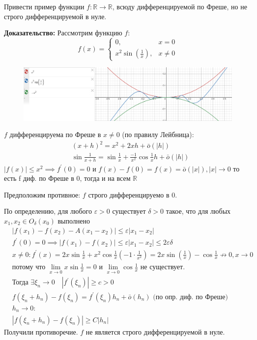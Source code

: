 \begin{task}
Привести пример функции $f: \mathbb{R} \rightarrow \mathbb{R}$, всюду дифференцируемой по Фреше, но не строго дифференцируемой в нуле.

\textbf{Доказательство:}
Рассмотрим функцию $f$:
\[
f(x)= \begin{cases}0, & x=0 \\ x^2 \sin \left(\frac{1}{x}\right), & x \neq 0\end{cases} 
\]

\begin{figure}[h!]
\centering
\includegraphics[width=0.99\linewidth]{image.png}
\end{figure}
 
$f$ дифференцируема по Фреше в $x \neq 0$ (по правилу Лейбница):
\[\begin{aligned}
&(x+h)^2 = x^2 +2xh+ \bar{o}(|h|)\\
& \sin{\frac{1}{x+h}} = \sin{\frac{1}{x}} + \frac{-1}{x^2} \cos{\frac{1}{x}}h + \bar{o}(|h|)
\end{aligned}\]
$|f(x)| \leq x^2 \implies f^{\prime}(0)=0$ и $f(x)-f(0)=f(x) =\bar{o}(|x|), |x| \rightarrow 0 $
то есть f диф. по Фреше в 0, тогда и на всем $\mathbb{R}$

Предположим противное: $f$ строго дифференцируемо в $0$.

По определению,  для любого $\varepsilon>0$ существует $\delta>0$ такое, что для любых $x_1, x_2 \in O_\delta\left(x_0\right)$ выполнено
\[\begin{aligned}
&|f\left(x_1\right)-f\left(x_2\right)-A\left(x_1-x_2\right)|\leq \varepsilon|x_1-x_2| \\
&f^{\prime}(0)=0 \implies |f\left(x_1\right)-f\left(x_2\right)|\leq \varepsilon|x_1-x_2|\leq 2\varepsilon \delta \\
& x\neq 0:  f^{\prime}(x)=2 x \sin \frac{1}{x}+x^2 \cos \frac{1}{x}\left(-1 \cdot \frac{1}{x^2}\right)=2 x \sin \left(\frac{1}{x}\right)-\cos \frac{1}{x} \nrightarrow 0, x \rightarrow 0 \\
& \text{потому что } \lim _{x \rightarrow 0} x \sin \frac{1}{x}=0 \text{ и } \lim _{x \rightarrow 0} \cos \frac{1}{x} \text{ не существует.} \\
& \text{Тогда }\exists \xi_n \rightarrow 0 \quad\left|f^{\prime}\left(\xi_n\right)\right| \geqslant c>0 \\
& f\left(\xi_n+h_n\right)-f\left(\xi_n\right)=f^{\prime}\left(\xi_n\right) h_n+\bar{o}\left(h_n\right) \text{ (по опр. диф. по Фреше)}\\
& h_n \longrightarrow 0 :\\
& \left|f\left(\xi_n+h_n\right)-f\left(\xi_n\right)\right| \geqslant C\left|h_n\right|
\end{aligned}\]
Получили противоречие. $f$ не является строго дифференцируемой в нуле.
\end{task}
